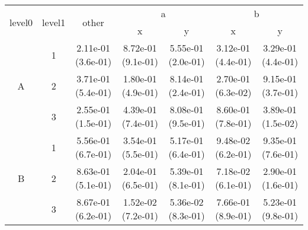 \begin{tabular}{ccccccc}
\toprule
\multirow{2}{*}{level0} & \multirow{2}{*}{level1}& \multirow{2}{*}{other}&\multicolumn{2}{c}{a}&\multicolumn{2}{c}{b}\tabularnewline
\cmidrule(lr){4-5}
\cmidrule(lr){6-7}
&&&x&y&x&y\tabularnewline
\midrule
\multirow{3}{*}{A}&1& 2.11e-01 (3.6e-01)& 8.72e-01 (9.1e-01)& 5.55e-01 (2.0e-01)& 3.12e-01 (4.4e-01)& 3.29e-01 (4.4e-01)\tabularnewline
&2& 3.71e-01 (5.4e-01)& 1.80e-01 (4.9e-01)& 8.14e-01 (2.4e-01)& 2.70e-01 (6.3e-02)& 9.15e-01 (3.7e-01)\tabularnewline
&3& 2.55e-01 (1.5e-01)& 4.39e-01 (7.4e-01)& 8.08e-01 (9.5e-01)& 8.60e-01 (7.8e-01)& 3.89e-01 (1.5e-02)\tabularnewline
\midrule
\multirow{3}{*}{B}&1& 5.56e-01 (6.7e-01)& 3.54e-01 (5.5e-01)& 5.17e-01 (6.4e-01)& 9.48e-02 (6.2e-01)& 9.35e-01 (7.6e-01)\tabularnewline
&2& 8.63e-01 (5.1e-01)& 2.04e-01 (6.5e-01)& 5.39e-01 (8.1e-01)& 7.18e-02 (6.1e-01)& 2.90e-01 (1.6e-01)\tabularnewline
&3& 8.67e-01 (6.2e-01)& 1.52e-02 (7.2e-01)& 5.36e-02 (8.3e-01)& 7.66e-01 (8.9e-01)& 5.23e-01 (9.8e-01)\tabularnewline
\bottomrule
\end{tabular}
